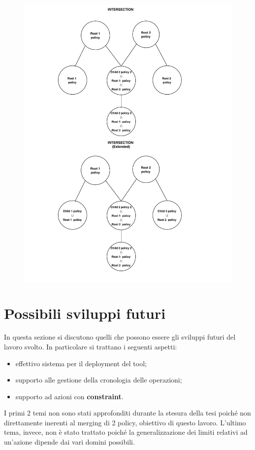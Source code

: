 \documentclass[12pt,a4paper,twoside]{book}
\begin{document}
\begin{figure}[H]
\centering
\includegraphics[scale=.90]{../immagini/DAGExampleRES.pdf}
\caption{}
\label{DAGResult}
\end{figure}
\section{Possibili sviluppi futuri}
In questa sezione si discutono quelli che possono essere gli sviluppi futuri del lavoro svolto. In particolare si trattano i seguenti aspetti:
\begin{itemize}
\item effettivo sistema per il deployment del tool;
\item supporto alle gestione della cronologia delle operazioni;
\item supporto ad azioni con \textbf{constraint}.
\end{itemize}
I primi 2 temi non sono stati approfonditi durante la stesura della tesi poiché non direttamente inerenti al merging di 2 policy, obiettivo di questo lavoro. L'ultimo tema, invece, non è stato trattato poiché la generalizzazione dei limiti relativi ad un'azione dipende dai vari domini possibili. 
\end{document}
